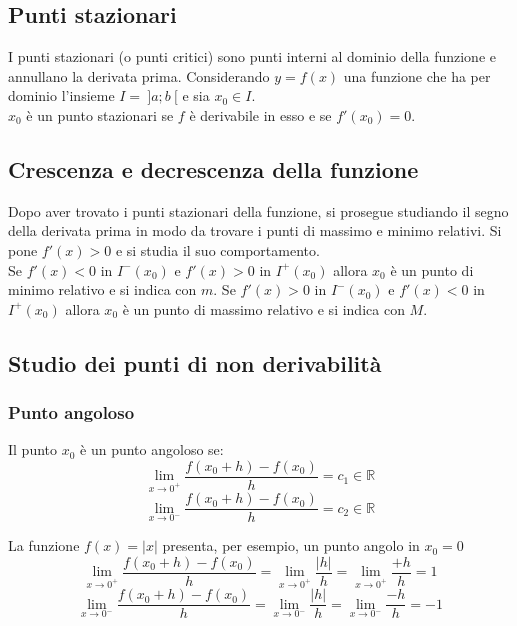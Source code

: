 \documentclass[a4paper,14pt]{extarticle}
\newcommand{\R}{\mathbb{R}}
\begin{document}
\subsection{Punti stazionari}
I punti stazionari (o punti critici) sono punti interni al dominio della funzione e annullano la derivata prima. Considerando $y = f(x)$ una funzione che ha per dominio l'insieme $I = \ ]a; b \ [$ e sia $x_0 \in I$. \\ $x_0$ è un punto stazionari se $f$ è derivabile in esso e se $f'(x_0) = 0$.
\subsection{Crescenza e decrescenza della funzione}
Dopo aver trovato i punti stazionari della funzione, si prosegue studiando il segno della derivata prima in modo da trovare i punti di massimo e minimo relativi. Si pone $f'(x) > 0$ e si studia il suo comportamento.\\
Se $f'(x) < 0$ in $I^-(x_0)$ e $f'(x) > 0$ in $I^+(x_0)$ allora $x_0$ è un punto di minimo relativo e si indica con $m$. Se $f'(x) > 0$ in $I^-(x_0)$ e $f'(x) < 0$ in $I^+(x_0)$ allora $x_0$ è un punto di massimo relativo e si indica con $M$. 

\subsection{Studio dei punti di non derivabilità}
\subsubsection{Punto angoloso}
Il punto $x_0$ è un punto angoloso se:
\large
\[ \lim_{x\to0^+} \frac{f(x_0 + h) - f(x_0)}{h} = c_1 \in\R \]
\[ \lim_{x\to0^-} \frac{f(x_0 + h) - f(x_0)}{h} = c_2 \in\R \]
\normalsize

La funzione $f(x) = |x|$ presenta, per esempio, un punto angolo in $x_0 = 0$
\large
\[ \lim_{x\to0^+} \frac{f(x_0 + h) - f(x_0)}{h} = \lim_{x\to0^+} \frac{|h|}{h} = \lim_{x\to0^+} \frac{+h}{h} = 1 \]
\[ \lim_{x\to0^-} \frac{f(x_0 + h) - f(x_0)}{h} = \lim_{x\to0^-} \frac{|h|}{h} = \lim_{x\to0^-} \frac{-h}{h} = -1 \]
\normalsize
\end{document}
